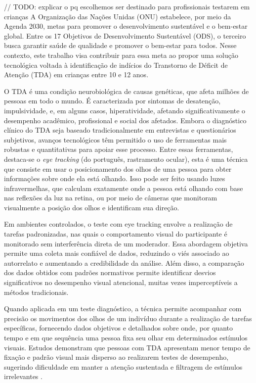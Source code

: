 // TODO: explicar o pq escolhemos ser destinado para profissionais testarem em crianças
A Organização das Nações Unidas (ONU) estabelece, por meio da Agenda 2030, metas para promover o desenvolvimento sustentável e o bem-estar global. Entre os 17 Objetivos de Desenvolvimento Sustentável (ODS), o terceiro busca garantir saúde de qualidade e promover o bem-estar para todos. Nesse contexto, este trabalho visa contribuir para essa meta ao propor uma solução tecnológica voltada à identificação de indícios do Transtorno de Déficit de Atenção (TDA) em crianças entre 10 e 12 anos.\textcite{unitednations2015agenda2030}

O TDA é uma condição neurobiológica de causas genéticas, que afeta milhões de pessoas em todo o mundo. É caracterizada por sintomas de
desatenção, impulsividade, e, em alguns casos, hiperatividade, afetando significativamente o
desempenho acadêmico, profissional e social dos afetados. Embora o diagnóstico clínico do
TDA seja baseado tradicionalmente em entrevistas e questionários subjetivos, avanços
tecnológicos têm permitido o uso de ferramentas mais robustas e quantitativas para apoiar
esse processo. \textcite{BVS2014}
Entre essas ferramentas, destaca-se o \textit{eye tracking} (do português, rastramento ocular), esta é uma técnica
que consiste em usar o posicionamento dos olhos de uma pessoa para obter informações
sobre onde ela está olhando. Isso pode ser feito usando luzes infravermelhas, que calculam
exatamente onde a pessoa está olhando com base nas reflexões da luz na retina, ou por
meio de câmeras que monitoram visualmente a posição dos olhos e identificam sua direção.

Em ambientes controlados, o teste com eye tracking envolve a realização de tarefas
padronizadas, nas quais o comportamento visual do participante é monitorado sem
interferência direta de um moderador. Essa abordagem objetiva permite uma coleta mais
confiável de dados, reduzindo o viés associado ao autorrelato e aumentando a credibilidade
da análise. Além disso, a comparação dos dados obtidos com padrões normativos permite
identificar desvios significativos no desempenho visual atencional, muitas vezes
imperceptíveis a métodos tradicionais.

Quando aplicada em um teste diagnóstico, a técnica permite acompanhar com
precisão os movimentos dos olhos de um indivíduo durante a realização de tarefas
específicas, fornecendo dados objetivos e detalhados sobre onde, por quanto tempo e em
que sequência uma pessoa fixa seu olhar em determinados estímulos visuais. Estudos
demonstram que pessoas com TDA apresentam menor tempo de fixação e padrão visual
mais disperso ao realizarem testes de desempenho, sugerindo dificuldade em manter a
atenção sustentada e filtragem de estímulos irrelevantes \textcite{Lim2024}.

